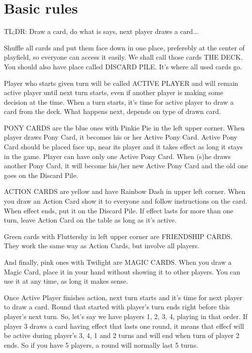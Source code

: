 \documentclass[notitlepage]{article}
\begin{document}
\section{Basic rules}
TL;DR: Draw a card, do what is says, next player draws a card...

Shuffle all cards and put them face down in one place, preferebly at the center of playfield, so everyone can access it easily. We shall call those cards THE DECK. You should also have place called DISCARD PILE. It's where all used cards go.

Player who starts given turn will be called ACTIVE PLAYER and will remain active player until next turn starts, even if another player is making some decision at the time. When a turn starts, it's time for active player to draw a card from the deck. What happens next, depends on type of drawn card.

PONY CARDS are the blue ones with Pinkie Pie in the left upper corner. When player draws Pony Card, it becomes his or her Active Pony Card. Active Pony Card should be placed face up, near its player and it takes effect as long it stays in the game. Player can have only one Active Pony Card. When (s)he draws another Pony Card, it will become his/her new Active Pony Card and the old one goes on the Discard Pile.

ACTION CARDS are yellow and have Rainbow Dash in upper left corner. When you draw an Action Card show it to everyone and follow instructions on the card. When effect ends, put it on the Discard Pile. If effect lasts for more than one turn, leave Action Card on the table as long as it's active.

Green cards with Fluttershy in left upper corner are FRIENDSHIP CARDS. They work the same way as Action Cards, but involve all players.

And finally, pink ones with Twilight are MAGIC CARDS. When you draw a Magic Card, place it in your hand without showing it to other players. You can use it at any time, as long it makes sense.

Once Active Player finishes action, next turn starts and it's time for next player to draw a card. Round that started with player's turn ends right before this player's next turn. So, let's say we have players 1, 2, 3, 4, playing in that order. If player 3 draws a card having effect that lasts one round, it means that effecf will be active during player's 3, 4, 1 and 2 turns and will end when turn of player 2 ends. So if you have 5 players, a round will normally last 5 turns.
\end{document}
